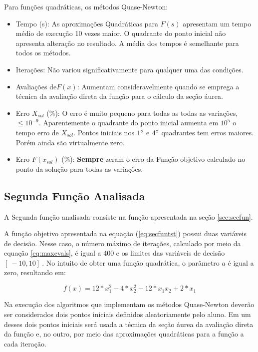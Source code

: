             Para funções quadráticas, os métodos Quase-Newton:
            \begin{itemize}
            \item {Tempo (s):} As aproximações Quadráticas para $F(s)$ apresentam um tempo médio de execução 10 vezes maior. O quadrante do ponto inicial não apresenta alteração no resultado. A média dos tempos é semelhante para todos os métodos.
            \item {Iterações:} Não variou significativamente para qualquer uma das condições.
            \item {Avaliações de$F(x)$:} Aumentam consideravelmente quando se emprega a técnica da avaliação direta da função para o cálculo da seção áurea. 
            \item {Erro $X_{sol}$ (\%):} O erro é muito pequeno para todas as todas as variações, $\leq 10^{-9}$. Aparentemente o quadrante do ponto inicial aumenta em $10^5$ o tempo erro de $X_{sol}$. Pontos iniciais nos $1\degree$ e $4\degree$ quadrantes tem erros maiores. Porém ainda são virtualmente zero.
            \item {Erro $F(x_{sol})$ (\%):} \textbf{Sempre} zeram o erro da Função objetivo calculado no ponto da solução para todas as variações. 
            \end{itemize}
            
    \subsection{Segunda Função Analisada}

    A Segunda função analisada consiste na função apresentada na seção \ref{sec:secfun}.

    A função objetivo apresentada na equação (\ref{eq:secfuntst}) possui duas variáveis de decisão. Nesse caso, o número máximo de iterações, calculado por meio da equação \ref{eq:maxevals}, é igual a 400 e os limites das variáveis de decisão $[\ -10 , 10 ]\ $. No intuito de obter uma função quadrática, o parâmetro $a$ é igual a zero, resultando em:

    \begin{equation*} 
        f(x) = 12*x_1^2 - 4*x_2^2 - 12*x_1x_2 + 2*x_1
    \end{equation*}
    
    Na execução dos algoritmos que implementam os métodos Quase-Newton deverão ser considerados dois pontos iniciais definidos aleatoriamente pelo aluno. Em um desses dois pontos iniciais será usada a técnica da seção áurea da avaliação direta da função e, no outro, por meio das aproximações quadráticas para a função a cada iteração. 

